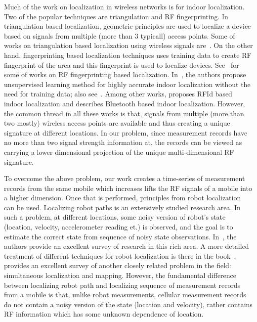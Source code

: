 \documentclass[conference, 10pt]{IEEEtran}
\begin{document}
Much of the work on localization in wireless networks is for indoor localization.
Two of the popular techniques are triangulation and RF fingerprinting. In
triangulation based localization, geometric principles are used to localize a device
based on signals from multiple (more than 3 typicall) access points. Some of works on
triangulation based localization using wireless signals
are~\cite{CruCos13Localization, Tarzia11indoorlocalization, Stelz04}.
On the other hand, fingerprinting based localization techniques uses training data to
create RF fingerprint of the area and this fingerprint is used to localize devices.
See~\cite{Chen2012Localization, Varshavsky07Localization, Elk2010Localization} for some of 
works on RF fingerprinting based localization. In~\cite{Wang12noneed}, the authors
propose unsupervised learning method for highly accurate indoor localization without
the need for training data; also see~\cite{raizee, Chintalapudi10indoorlocalization}. 
Among other works, \cite{Lionel12RFID} proposes RFId based indoor
localization and \cite{Altini10BTLocal} describes Bluetooth based indoor localization.
However, the common thread in all these works is that, signals from multiple (more
than two mostly) wireless access points are available and thus creating a unique
signature at different locations. In our problem, since measurement records have no
more than two signal strength information at, the records can be viewed
as carrying a lower dimensional projection of the unique multi-dimensional RF
signature.




To overcome the above problem, our work creates a time-series of measurement records
from the same mobile which increases lifts the RF signals of a mobile into a higher
dimension. Once that is performed, principles from robot localization can be used.
Localizing robot paths is an extensively studied research area. In such a problem, at different
locations, some noisy version of robot's state (location, velocity, accelerometer
reading et.) is observed, and the goal is to estimate the correct state from sequence
of noisy state observations. In~\cite{Thrun_roboticmapping}, the authors provide an
excellent survey of research in this rich area. A more detailed treatment of
different techniques for robot localization is there in the book~\cite{probrobotics}.
\cite{slamsurvey} provides an excellent survey of another closely related problem in the
field: simultaneous localization and mapping.
However, the fundamental difference between localizing robot path and localizing
sequence of measurement records from a mobile is that, unlike robot measurements,
cellular measurement
records do not contain a noisy version of the state (location and velocity), rather
contains RF information which has some unknown dependence of location. 
\end{document}
